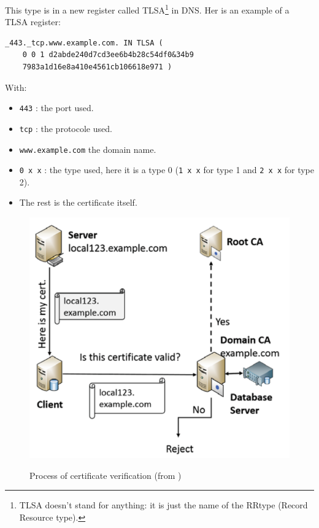 \documentclass[journal, a4paper]{IEEEtran}
\begin{document}
This type is in a new register called TLSA\footnote{TLSA doesn't stand for anything: it is just the name of the RRtype (Record Resource type).} in DNS. Her is an example of a TLSA register:\\
\begin{Verbatim}[fontsize=\small]
_443._tcp.www.example.com. IN TLSA (
	0 0 1 d2abde240d7cd3ee6b4b28c54df0&34b9
	7983a1d16e8a410e4561cb106618e971 )
\end{Verbatim}
With:
\begin{itemize}
	\item \verb$443$ : the port used.
	\item \verb$tcp$ : the protocole used.
	\item \verb$www.example.com$ the domain name.
	\item \verb$0 x x$ : the type used, here it is a type 0 (\verb$1 x x$ for type 1 and \verb$2 x x$ for type 2).
	\item The rest is the certificate itself.
\end{itemize}

\begin{figure}[!hbt]
	\begin{center}
	\includegraphics[scale=0.4]{danereq.png}
	\label{fig:pki}
	\caption{Process of certificate verification (from \cite{wang2015domain})}
	\end{center}
\end{figure}
\end{document}

